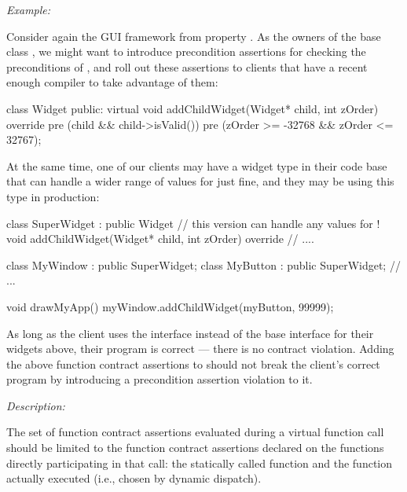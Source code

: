 

\emph{Example:}

Consider again the GUI framework from property . As the owners of the base class , we might want to introduce precondition assertions for checking the preconditions of \allowbreak{}, and roll out these assertions to clients that have a recent enough compiler to take advantage of them: 

\begin{codeblock}
class Widget {
public:
  virtual void addChildWidget(Widget* child, int zOrder) override
    pre (child && child->isValid())
    pre (zOrder >= -32768 && zOrder <= 32767);
}
\end{codeblock}

At the same time, one of our clients may have a widget type in their code base that can handle a wider range of values for  just fine, and they may be using this type in production:

\begin{codeblock}
class SuperWidget : public Widget {
  // this version can handle any values for !
  void addChildWidget(Widget* child, int zOrder) override {
    // ....
  } 
}

class MyWindow : public SuperWidget;
class MyButton : public SuperWidget;
// ...

void drawMyApp() {
  myWindow.addChildWidget(myButton, 99999);
}
\end{codeblock}
As long as the client uses the  interface instead of the base  interface for their widgets above, their program is correct --- there is no contract violation. Adding the above function contract assertions to \allowbreak{} should not break the client's correct program by introducing a precondition assertion violation to it.



\emph{Description:}

The set of function contract assertions evaluated during a virtual function call should be limited to the function contract assertions declared on the functions directly participating in that call: the statically called
function and the function actually executed (i.e., chosen by dynamic dispatch). 

